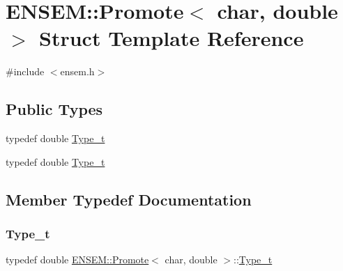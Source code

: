\hypertarget{structENSEM_1_1Promote_3_01char_00_01double_01_4}{}\section{E\+N\+S\+EM\+:\+:Promote$<$ char, double $>$ Struct Template Reference}
\label{structENSEM_1_1Promote_3_01char_00_01double_01_4}


{\ttfamily \#include $<$ensem.\+h$>$}

\subsection*{Public Types}
\begin{DoxyCompactItemize}
\item 
typedef double \mbox{\hyperlink{structENSEM_1_1Promote_3_01char_00_01double_01_4_a2d74824409365a6005f55424a8314837}{Type\+\_\+t}}
\item 
typedef double \mbox{\hyperlink{structENSEM_1_1Promote_3_01char_00_01double_01_4_a2d74824409365a6005f55424a8314837}{Type\+\_\+t}}
\end{DoxyCompactItemize}


\subsection{Member Typedef Documentation}
\mbox{\label{structENSEM_1_1Promote_3_01char_00_01double_01_4_a2d74824409365a6005f55424a8314837}} 
\subsubsection{\texorpdfstring{Type\_t}{Type\_t}\hspace{0.1cm}{\footnotesize\ttfamily [1/2]}}
{\footnotesize\ttfamily typedef double \mbox{\hyperlink{structENSEM_1_1Promote}{E\+N\+S\+E\+M\+::\+Promote}}$<$ char, double $>$\+::\mbox{\hyperlink{structENSEM_1_1Promote_3_01char_00_01double_01_4_a2d74824409365a6005f55424a8314837}{Type\+\_\+t}}}

\mbox{\label{structENSEM_1_1Promote_3_01char_00_01double_01_4_a2d74824409365a6005f55424a8314837}} 
